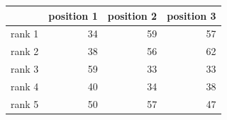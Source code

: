 \begin{tabular}{lrrr}
\toprule
 & position 1 & position 2 & position 3 \\
\midrule
rank 1 & 34 & 59 & 57 \\
rank 2 & 38 & 56 & 62 \\
rank 3 & 59 & 33 & 33 \\
rank 4 & 40 & 34 & 38 \\
rank 5 & 50 & 57 & 47 \\
\bottomrule
\end{tabular}
